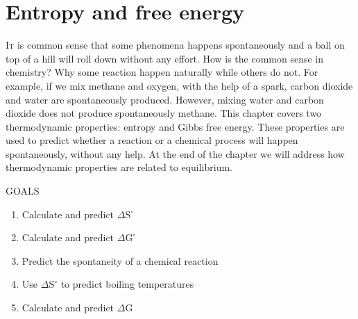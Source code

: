\documentclass[main.tex]{subfiles}
\begin{document}
\linenumbers
  
\chapter[Entropy and free energy]{Entropy and free energy}


      \begin{marginfigure}
\end{marginfigure}


\lettrine[lines=4]{\color{black!45}I}{t} is common sense that some phenomena happens spontaneously and a ball on top of a hill will roll down without any effort. How is the common sense in chemistry? Why some reaction happen naturally while others do not. For example, if we mix methane and oxygen, with the help of a spark, carbon dioxide and water are spontaneously produced. However, mixing water and carbon dioxide does not produce spontaneously methane. This chapter covers two thermodynamic properties:  entropy and Gibbs free energy. These properties are used to predict whether a reaction or a chemical process will happen spontaneously, without any help. At the end of the chapter we will address how thermodynamic properties are related to equilibrium. 
\begin{marginfigure}%
\begin{mytcbox}{GOALS}
\begin{enumerate}[label=\protect\circled{\color{white}\arabic*}]
\item Calculate and predict $\Delta \text{S}^{\circ}$
\item Calculate and predict $\Delta \text{G}^{\circ}$
\item Predict the spontaneity of a chemical reaction
\item Use $\Delta \text{S}^{\circ}$ to predict boiling temperatures
\item Calculate and predict $\Delta \text{G}$
\end{enumerate}
\end{mytcbox}
\vspace{1cm}
\begin{tcolorbox}[enhanced,colback=red!5!white,colframe=black!50!red,boxrule=1pt,
  arc=0pt,outer arc=0pt,drop heavy lifted shadow]
\faGears\ 
 \discussionTHERMODYN \end{tcolorbox}
\end{marginfigure}%
\end{document}
